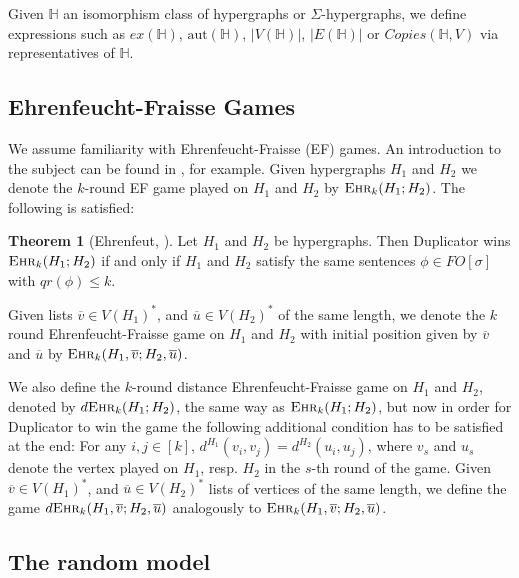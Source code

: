 \documentclass[12pt,notitlepage,a4paper]{article}
\theoremstyle{definition}
\newtheorem{theorem}{Theorem}[section]
\newcommand{\ehr}{\textsc{Ehr}}
\newcommand{\aut}{\mathrm{aut}}
\begin{document}
Given $\mathbb{H}$ an isomorphism class of hypergraphs or $\Sigma$-hypergraphs,
we define expressions
such as $ex(\mathbb{H})$, $\aut(\mathbb{H})$,
$|V(\mathbb{H})|$, $|E(\mathbb{H})|$ or
$Copies(\mathbb{H},V)$ via representatives of $\mathbb{H}$.\par 




\subsection{Ehrenfeucht-Fraisse Games}

We assume familiarity with Ehrenfeucht-Fraisse (EF) games.
An introduction to the subject can be found in
\cite[Section 2]{finitemodeltheory1}, for example. Given
hypergraphs $H_1$ and $H_2$ we denote the $k$-round EF game played 
on $H_1$ and
$H_2$ by $\ehr_k(H_1;H_2)$.
The following is satisfied:

\begin{theorem}
	[Ehrenfeut, \citealp{ehrenfeucht1961application}] Let
	$H_1$ and $H_2$ be hypergraphs.
	Then Duplicator wins $\ehr_k(H_1;H_2)$
	if and only if $H_1$ and $H_2$ satisfy the same 
	sentences $\phi\in FO[\sigma]$ with $qr(\phi)\leq k$.		
\end{theorem}

Given lists $\overline{v}\in V(H_1)^*$, and 
$\overline{u}\in V(H_2)^*$ of the same length, 
we denote the $k$ round 
Ehrenfeucht-Fraisse game on $H_1$ and $H_2$ with initial position given
by $\overline{v}$ and $\overline{u}$ by $\ehr_k(H_1,\overline{v};H_2,\overline{u})$.\par

We also define the $k$-round distance Ehrenfeucht-Fraisse game on 
$H_1$ and $H_2$, denoted by $d\ehr_k(H_1;H_2)$, the same way as
$\ehr_k(H_1;H_2)$, but now in order for Duplicator to win the
game the following additional condition has to be satisfied 
at the end: For any $i,j\in [k]$, $d^{H_1}(v_i,v_j)=d^{H_2}(u_i,u_j)$,
where $v_s$ and $u_s$ denote the vertex played on $H_1$, resp. $H_2$ in the 
$s$-th round of the game. 
Given $\overline{v}\in V(H_1)^*$, and $\overline{u}\in V(H_2)^*$
lists of vertices of the same length,
we define the game 
$d\ehr_k(H_1,\overline{v};H_2,\overline{u})$ analogously to 
$\ehr_k(H_1,\overline{v};H_2,\overline{u})$.


\subsection{The random model} \label{sect:random}
\end{document}
